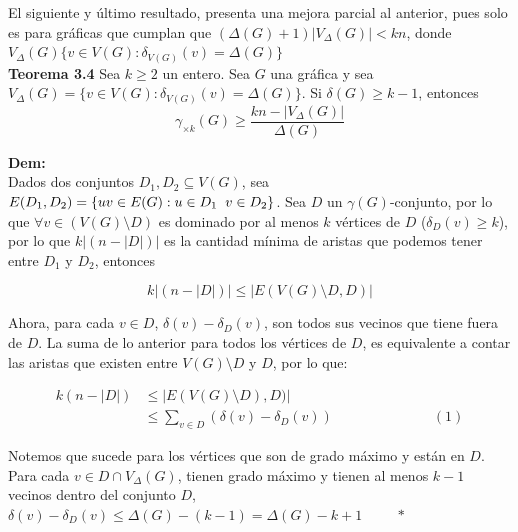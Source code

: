 \documentclass{article}
\begin{document}
El siguiente y último resultado, presenta una mejora parcial al anterior, pues solo es para gráficas que cumplan que $(\Delta(G)+1)|V_\Delta(G)|<kn$, donde $V_\Delta(G)\{v\in V(G): \delta_{V(G)}(v)=\Delta(G)\}$\\


\textbf{Teorema 3.4} Sea $k\geq 2$ un entero. Sea $G$ una gráfica y sea $V_\Delta(G)=\{v\in V(G): \delta_{V(G)}(v)=\Delta(G)\}$. Si $\delta(G)\geq k-1$, entonces\\

$$\gamma_{\times k}(G)\geq \frac{kn-|V_\Delta(G)|}{\Delta(G)}$$

\textbf{Dem:}\\

Dados dos conjuntos $D_1, D_2 \subseteq V(G)$, sea $E(D_1,D_2)=\{uv\in E(G): u\in D_1 \hspace{2mm} v\in D_2\}$. Sea $D$ un $\gamma(G)$-conjunto, por lo que $\forall v\in (V(G)\setminus D)$ es dominado por al menos $k$ vértices de $D$ ($\delta_D(v)\geq k$), por lo que $k|(n-|D|)|$ es la cantidad mínima de aristas que podemos tener entre $D_1$ y $D_2$, entonces

$$k|(n-|D|)|\leq |E(V(G)\setminus D,D)|$$

Ahora, para cada $v\in D$, $\delta(v)-\delta_D(v)$, son todos sus vecinos que tiene fuera de $D$. La suma de lo anterior para todos los vértices de $D$, es equivalente a contar las aristas que existen entre $V(G)\setminus D$ y $D$, por lo que:

\begin{align*}
k(n-|D|)&\leq |E(V(G)\setminus D),D)|\\
&\leq \sum_{v\in D}(\delta(v)-\delta_D(v)) \hspace{3cm} (1)
\end{align*}

Notemos que sucede para los vértices que son de grado máximo y están en $D$. Para cada $v\in D\cap V_\Delta(G)$, tienen grado máximo y tienen al menos $k-1$ vecinos dentro del conjunto $D$, $\delta(v)-\delta_D(v)\leq \Delta(G)-(k-1)=\Delta(G)-k+1 \hspace{1cm} *$\\
\end{document}
